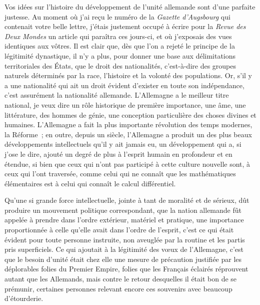 \documentclass[french,twoside]{book} %
\begin{document}
Vos idées sur l’histoire du développement de l’unité allemande sont d’une parfaite justesse. Au moment où j’ai reçu le numéro de la {\itshape Gazette d’Augsbourg} qui contenait votre belle lettre, j’étais justement occupé à écrire pour la {\itshape Revue des Deux Mondes} un article qui paraîtra ces jours-ci, et où j’exposais des vues identiques aux vôtres. Il est clair que, dès que l’on a rejeté le principe de la légitimité dynastique, il n’y a plus, pour donner une base aux délimitations territoriales des États, que le droit des nationalités, c’est-à-dire des groupes naturels déterminés par la race, l’histoire et la volonté des populations. Or, s’il y a une nationalité qui ait un droit évident d’exister en toute son indépendance, c’est assurément la nationalité allemande. L’Allemagne a le meilleur titre national, je veux dire un rôle historique de première importance, une âme, une littérature, des hommes de génie, une conception particulière des choses divines et humaines. L’Allemagne a fait la plus importante révolution des temps modernes, la Réforme ; en outre, depuis un siècle, l’Allemagne a produit un des plus beaux développements intellectuels qu’il y ait jamais eu, un développement qui a, si j’ose le dire, ajouté un degré de plus à l’esprit humain en profondeur et en étendue, si bien que ceux qui n’ont pas participé à cette culture nouvelle sont, à ceux qui l’ont traversée, comme celui qui ne connaît que les mathématiques élémentaires est à celui qui connaît le calcul différentiel.\par
Qu’une si grande force intellectuelle, jointe à tant de moralité et de sérieux, dût produire un mouvement politique correspondant, que la nation allemande fût appelée à prendre dans l’ordre extérieur, matériel et pratique, une importance proportionnée à celle qu’elle avait dans l’ordre de l’esprit, c’est ce qui était évident pour toute personne instruite, non aveuglée par la routine et les partis pris superficiels. Ce qui ajoutait à la légitimité des vœux de l’Allemagne, c’est que le besoin d’unité était chez elle une mesure de précaution justifiée par les déplorables folies du Premier Empire, folies que les Français éclairés réprouvent autant que les Allemands, mais contre le retour desquelles il était bon de se prémunir, certaines personnes relevant encore ces souvenirs avec beaucoup d’étourderie.\par
\end{document}
